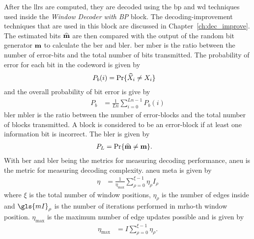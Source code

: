 After the \glspl{llr} are computed, they are decoded using the \gls{bp} and \gls{wd} techniques used inside the \emph{Window Decoder with BP} block. The decoding-improvement techniques that are used in this block are discussed in Chapter~\ref{ch:dec_improve}. The estimated bits $\widehat{\mathbf{m}}$ are then compared with the output of the random bit generator $\mathbf{m}$ to calculate the \gls{ber} and \gls{bler}. \gls{ber} \gls{mber} is the ratio between the number of error-bits and the total number of bits transmitted. The probability of error for each bit in the codeword is given by
\begin{align}
P_b(i)&=\text{Pr}\{\widehat{X}_i\neq X_i\}
\end{align}
and the overall probability of bit error is give by
\begin{align}
P_b&=\frac{1}{Ln}\sum_{i=0}^{Ln-1}P_b(i)\label{eq:indiv_prob}
\end{align}
\gls{bler} \gls{mbler} is the ratio between the number of error-blocks and the total number of blocks transmitted. A block is considered to be an error-block if at least one information bit is incorrect. The \gls{bler} is given by
\begin{align}
P_L&=\text{Pr}\{\widehat{\mathbf{m}}\neq \mathbf{m}\}.
\end{align}
With \gls{ber} and \gls{bler} being the metrics for measuring decoding performance, \gls{aneu} is the metric for measuring decoding complexity. \gls{aneu} \gls{meta} is given by
\begin{align}
\eta&=\frac{1}{\eta_{\text{max}}}\sum_{\rho=0}^{\xi-1}\eta_\rho I_\rho
\end{align}
where $\xi$ is the total number of window positions, $\eta_\rho$ is the number of edges inside and $\gls{mI}_\rho$ is the number of iterations performed in \gls{mrho}-th window position. $\eta_{\text{max}}$ is the maximum number of edge updates possible and is given by
\begin{align}
\eta_{\text{max}}&=I\sum_{\rho=0}^{\xi-1}\eta_\rho.
\end{align}